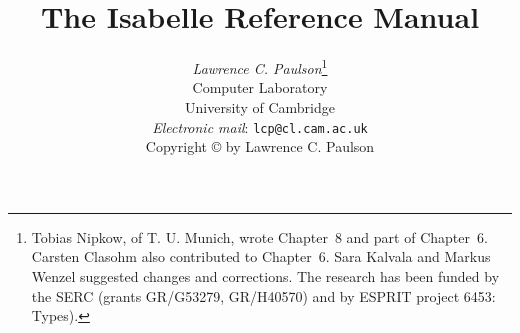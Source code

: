 \title{The Isabelle Reference Manual}

\author{{\em Lawrence C. Paulson}\thanks
{Tobias Nipkow, of T. U. Munich, wrote Chapter~8 and part of Chapter~6.
 Carsten Clasohm also contributed to Chapter~6.
 Sara Kalvala and Markus Wenzel suggested changes and corrections.
 The research has been funded by the SERC (grants GR/G53279, GR/H40570)
  and by ESPRIT project 6453: Types).} 
\\  
        Computer Laboratory \\ University of Cambridge \\[2ex]
        {\small{\em Electronic mail\/}: {\tt lcp@cl.cam.ac.uk}} \\[3cm]
    {\small Copyright \copyright{} \number\year{} by Lawrence C. Paulson}
}
\date{} 
\makeindex

\underscoreoff

\setcounter{secnumdepth}{1} \setcounter{tocdepth}{2}

\pagestyle{headings}
\sloppy
\binperiod     %













 \small\raggedright\frenchspacing



